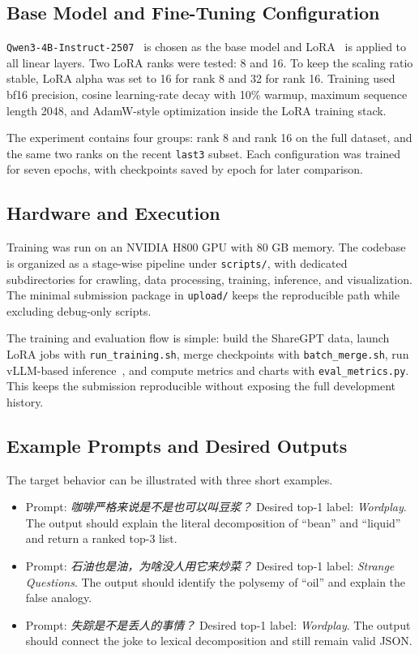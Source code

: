\documentclass{article}
\begin{document}
\subsection{Base Model and Fine-Tuning Configuration}
 \texttt{Qwen3-4B-Instruct-2507}~\cite{Yang2025Qwen3} is chosen as the base model and LoRA~\cite{Hu2021LoRA} is applied to all linear layers. Two LoRA ranks were tested: 8 and 16. To keep the scaling ratio stable, LoRA alpha was set to 16 for rank 8 and 32 for rank 16. Training used bf16 precision, cosine learning-rate decay with 10\% warmup, maximum sequence length 2048, and AdamW-style optimization inside the LoRA training stack.

The experiment contains four groups: rank 8 and rank 16 on the full dataset, and the same two ranks on the recent \texttt{last3} subset. Each configuration was trained for seven epochs, with checkpoints saved by epoch for later comparison.

\subsection{Hardware and Execution}
Training was run on an NVIDIA H800 GPU with 80 GB memory. The codebase is organized as a stage-wise pipeline under \texttt{scripts/}, with dedicated subdirectories for crawling, data processing, training, inference, and visualization. The minimal submission package in \texttt{upload/} keeps the reproducible path while excluding debug-only scripts.

The training and evaluation flow is simple: build the ShareGPT data, launch LoRA jobs with \texttt{run\_training.sh}, merge checkpoints with \texttt{batch\_merge.sh}, run vLLM-based inference~\cite{Kwon2023}, and compute metrics and charts with \texttt{eval\_metrics.py}. This keeps the submission reproducible without exposing the full development history.

\subsection{Example Prompts and Desired Outputs}
The target behavior can be illustrated with three short examples.
\begin{itemize}[leftmargin=1.5em]
    \item Prompt: \textit{咖啡严格来说是不是也可以叫豆浆？} Desired top-1 label: \textit{Wordplay}. The output should explain the literal decomposition of ``bean'' and ``liquid'' and return a ranked top-3 list.
    \item Prompt: \textit{石油也是油，为啥没人用它来炒菜？} Desired top-1 label: \textit{Strange Questions}. The output should identify the polysemy of ``oil'' and explain the false analogy.
    \item Prompt: \textit{失踪是不是丢人的事情？} Desired top-1 label: \textit{Wordplay}. The output should connect the joke to lexical decomposition and still remain valid JSON.
\end{itemize}
\end{document}
